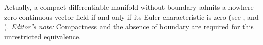 \documentclass[../main]{subfiles}
\begin{document}
Actually, a compact differentiable manifold without boundary admits a nowhere-zero continuous vector field if and only if its Euler characteristic is zero (see \cite[p. 203]{steenrod1951the}, and \cite[p. 549]{alexandroff1935topologie}). \emph{Editor's note:} Compactness and the absence of boundary are required for this unrestricted equivalence.
\end{document}
